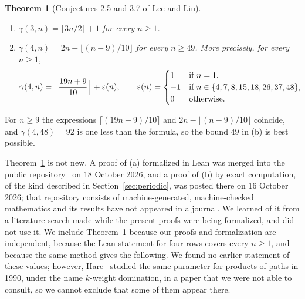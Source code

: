\documentclass[12pt]{article}
\newcommand{\fl}[1]{\lfloor #1 \rfloor}
\newcommand{\ce}[1]{\lceil #1 \rceil}
\theoremstyle{plain}
\newtheorem{theorem}{Theorem}
\theoremstyle{remark}
\begin{document}
\begin{theorem}[Conjectures 2.5 and 3.7 of Lee and Liu]\label{thm:ll}
\begin{enumerate}
\item[(a)] $\gamma(3,n)=\fl{3n/2}+1$ for every $n\ge1$.
\item[(b)] $\gamma(4,n)=2n-\fl{(n-9)/10}$ for every $n\ge49$. More precisely, for every $n\ge1$,
\[
\gamma(4,n)=\Bigl\lceil\frac{19n+9}{10}\Bigr\rceil+\varepsilon(n),
\qquad
\varepsilon(n)=\begin{cases}1&\text{if }n=1,\\-1&\text{if }n\in\{4,7,8,15,18,26,37,48\},\\0&\text{otherwise.}\end{cases}
\]
\end{enumerate}
\end{theorem}

For $n\ge9$ the expressions $\ce{(19n+9)/10}$ and $2n-\fl{(n-9)/10}$ coincide, and
$\gamma(4,48)=92$ is one less than the formula, so the bound $49$ in (b) is best possible.

Theorem~\ref{thm:ll} is not new. A proof of (a) formalized in Lean was merged into the public
repository~\cite{omega} on 18 October 2026, and a proof of (b) by exact computation, of the kind
described in Section~\ref{sec:periodic}, was posted there on 16 October 2026; that repository
consists of machine-generated, machine-checked mathematics and its results have not appeared in
a journal. We learned of it from a literature search made while the present proofs were being
formalized, and did not use it. We include Theorem~\ref{thm:ll} because our proofs and
formalization are independent, because the Lean statement for four rows covers every $n\ge1$,
and because the same method gives the following. We found no earlier statement of these values;
however, Hare~\cite{hare90} studied the same parameter for products of paths in 1990, under the
name $k$-weight domination, in a paper that we were not able to consult, so we cannot exclude
that some of them appear there.
\end{document}
